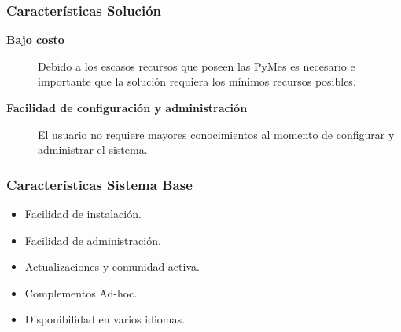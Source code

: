 \documentclass[10pt, compress]{beamer}
\begin{document}
\begin{frame}
 \frametitle{Características Solución}
\begin{description}
 \item[\textbf{Bajo costo}] Debido a los escasos recursos que poseen las PyMes es necesario e importante que
la solución requiera los mínimos recursos posibles.
 \item[\textbf{Facilidad de configuración y administración}] El usuario no requiere mayores conocimientos al momento
de configurar y administrar el sistema.
\end{description}
\end{frame}

\begin{frame}
 \frametitle{Características Sistema Base}

\begin{itemize}
 \item Facilidad de instalación.
 \item Facilidad de administración.
 \item Actualizaciones y comunidad activa.
 \item Complementos Ad-hoc.
 \item Disponibilidad en varios idiomas.
\end{itemize}
\end{frame}
\end{document}

